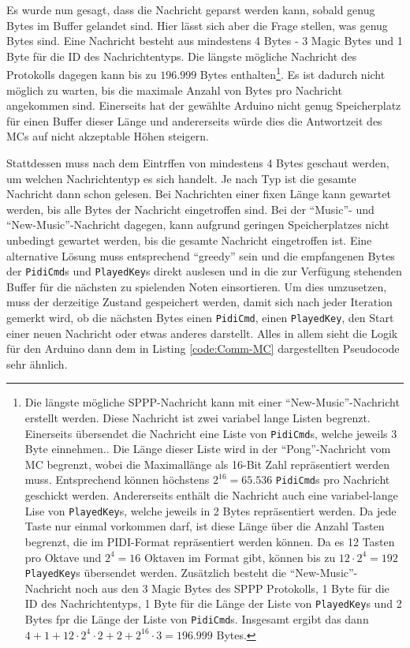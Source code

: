 Es wurde nun gesagt, dass die Nachricht geparst werden kann, sobald genug Bytes im Buffer gelandet sind.
Hier lässt sich aber die Frage stellen, was genug Bytes sind.
Eine Nachricht besteht aus mindestens 4 Bytes - 3 Magic Bytes und 1 Byte für die ID des Nachrichtentyps.
Die längste mögliche Nachricht des Protokolls dagegen kann bis zu $196.999$ Bytes enthalten\footnote{Die längste mögliche \ac{SPPP}-Nachricht kann mit einer \enquote{New-Music}-Nachricht erstellt werden. Diese Nachricht ist zwei variabel lange Listen begrenzt. Einerseits übersendet die Nachricht eine Liste von \lstinline|PidiCmd|s, welche jeweils 3 Byte einnehmen.. Die Länge dieser Liste wird in der \enquote{Pong}-Nachricht vom \ac{MC} begrenzt, wobei die Maximallänge als 16-Bit Zahl repräsentiert werden muss. Entsprechend können höchstens $2^{16} = 65.536$ \lstinline|PidiCmd|s pro Nachricht geschickt werden. Andererseits enthält die Nachricht auch eine variabel-lange Lise von \lstinline|PlayedKey|s, welche jeweils in 2 Bytes repräsentiert werden. Da jede Taste nur einmal vorkommen darf, ist diese Länge über die Anzahl Tasten begrenzt, die im \ac{PIDI}-Format repräsentiert werden können. Da es 12 Tasten pro Oktave und $2^4=16$ Oktaven im Format gibt, können bis zu $12 \cdot 2^4 = 192$ \lstinline|PlayedKey|s übersendet werden. Zusätzlich besteht die \enquote{New-Music}-Nachricht noch aus den 3 Magic Bytes des \ac{SPPP} Protokolls, 1 Byte für die ID des Nachrichtentyps, 1 Byte für die Länge der Liste von \lstinline|PlayedKey|s und 2 Bytes fpr die Länge der Liste von \lstinline|PidiCmd|s. Insgesamt ergibt das dann $4 + 1 + 12 \cdot 2^4 \cdot 2 + 2 + 2^{16} \cdot 3 = 196.999$ Bytes.}.
Es ist dadurch nicht möglich zu warten, bis die maximale Anzahl von Bytes pro Nachricht angekommen sind.
Einerseits hat der gewählte Arduino nicht genug Speicherplatz für einen Buffer dieser Länge und andererseits würde dies die Antwortzeit des \ac{MC}s auf nicht akzeptable Höhen steigern.

Stattdessen muss nach dem Eintrffen von mindestens 4 Bytes geschaut werden, um welchen Nachrichtentyp es sich handelt.
Je nach Typ ist die gesamte Nachricht dann schon gelesen.
Bei Nachrichten einer fixen Länge kann gewartet werden, bis alle Bytes der Nachricht eingetroffen sind.
Bei der \enquote{Music}- und \enquote{New-Music}-Nachricht dagegen, kann aufgrund geringen Speicherplatzes nicht unbedingt gewartet werden, bis die gesamte Nachricht eingetroffen ist.
Eine alternative Lösung muss entsprechend \enquote{greedy} sein und die empfangenen Bytes der \lstinline|PidiCmd|s und \lstinline|PlayedKey|s direkt auslesen und in die zur Verfügung stehenden Buffer für die nächsten zu spielenden Noten einsortieren.
Um dies umzusetzen, muss der derzeitige Zustand gespeichert werden, damit sich nach jeder Iteration gemerkt wird, ob die nächsten Bytes einen \lstinline|PidiCmd|, einen \lstinline|PlayedKey|, den Start einer neuen Nachricht oder etwas anderes darstellt.
Alles in allem sieht die Logik für den Arduino dann dem in Listing \ref{code:Comm-MC} dargestellten Pseudocode sehr ähnlich.

